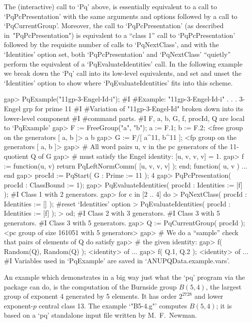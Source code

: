 The (interactive) call to `Pq' above, is essentially equivalent to a call
to `PqPcPresentation' with the same arguments and options followed  by  a
call to `PqCurrentGroup'. Moreover, the call  to  `PqPcPresentation'  (as
described in~"PqPcPresentation") is equivalent to a ``class 1''  call  to
`PqPcPresentation'  followed  by  the  requisite  number  of   calls   to
`PqNextClass',   and   with   the   `Identities'   option    set,    both
`PqPcPresentation' and `PqNextClass' ``quietly'' perform  the  equivalent
of a `PqEvaluateIdentities' call. In the following example we break  down
the `Pq' call into its low-level  equivalents,  and  set  and  unset  the
`Identities' option to show where `PqEvaluateIdentities' fits  into  this
scheme.

\begintt
gap> PqExample("11gp-3-Engel-Id-i");
#I  #Example: "11gp-3-Engel-Id-i" . . . 3-Engel grp for prime 11
#I  #Variation of "11gp-3-Engel-Id" broken down into its lower-level component
#I  #command parts.
#I  F, a, b, G, f, procId, Q are local to `PqExample'
gap> F := FreeGroup("a", "b"); a := F.1; b := F.2;
<free group on the generators [ a, b ]>
a
b
gap> G := F/[ a^11, b^11 ];
<fp group on the generators [ a, b ]>
gap> # All word pairs u, v in the pc generators of the 11-quotient Q of G 
gap> # must satisfy the Engel identity: [u, v, v, v] = 1.
gap> f := function(u, v) return PqLeftNormComm( [u, v, v, v] ); end;
function( u, v ) ... end
gap> procId := PqStart( G : Prime := 11 );
4
gap> PqPcPresentation( procId : ClassBound := 1);
gap> PqEvaluateIdentities( procId : Identities := [f] );
#I  Class 1 with 2 generators.
gap> for c in [2 .. 4] do
>      PqNextClass( procId : Identities := [] ); #reset `Identities' option
>      PqEvaluateIdentities( procId : Identities := [f] );
>    od;
#I  Class 2 with 3 generators.
#I  Class 3 with 5 generators.
#I  Class 3 with 5 generators.
gap> Q := PqCurrentGroup( procId );
<pc group of size 161051 with 5 generators>
gap> # We do a ``sample'' check that pairs of elements of Q do satisfy
gap> # the given identity:
gap> f( Random(Q), Random(Q) );
<identity> of ...
gap> f( Q.1, Q.2 );
<identity> of ...
#I  Variables used in `PqExample' are saved in `ANUPQData.example.vars'.
\endtt


An example which demonstrates in a big way just what the `pq' program via
the {\ANUPQ}  package can  do, is the  computation of the  Burnside group
$B(5, 4)$, the  largest group of exponent 4 generated  by 5 elements.  It
has order $2^{2728}$ and lower exponent-$p$ central class 13. The example
`"B5-4.g"' computes $B(5, 4)$; it is based on  a  `pq'  standalone  input
file written by M.~F.~Newman.

